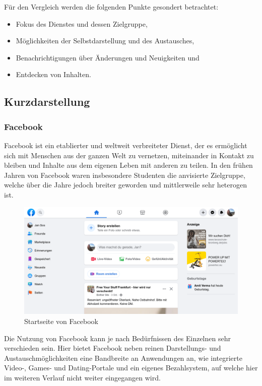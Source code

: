 Für den Vergleich werden die folgenden Punkte gesondert betrachtet:

\begin{itemize}
    \item Fokus des Dienstes und dessen Zielgruppe,
    \item Möglichkeiten der Selbstdarstellung und des Austausches,
    \item Benachrichtigungen über Änderungen und Neuigkeiten und
    \item Entdecken von Inhalten.
\end{itemize}

\subsection{Kurzdarstellung}

\subsubsection{Facebook}

Facebook ist ein etablierter und weltweit verbreiteter Dienst, der es ermöglicht sich mit Menschen aus der ganzen Welt zu vernetzen, miteinander in Kontakt zu bleiben und Inhalte aus dem eigenen Leben mit anderen zu teilen.
In den frühen Jahren von Facebook waren insbesondere Studenten die anvisierte Zielgruppe, welche über die Jahre jedoch breiter geworden und mittlerweile sehr heterogen ist.

\begin{figure}
    \centering
    \includegraphics[width=\textwidth]{figures/jan/pic_facebook.png}
    \caption[Startseite von Facebook]{Startseite von Facebook}
    \label{fig:facebook}
\end{figure}

Die Nutzung von Facebook kann je nach Bedürfnissen des Einzelnen sehr verschieden sein. Hier bietet Facebook neben reinen Darstellungs- und Austauschmöglichkeiten eine Bandbreite an Anwendungen an, wie \ua integrierte Video-, Games- und Dating-Portale und ein eigenes Bezahlsystem, auf welche hier im weiteren Verlauf nicht weiter eingegangen wird.

